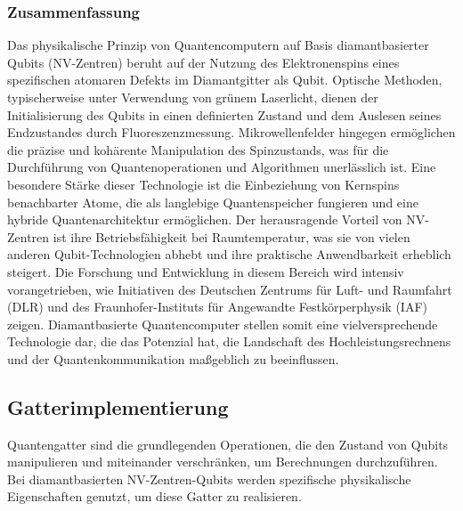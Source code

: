 \subsubsection{Zusammenfassung}
Das physikalische Prinzip von Quantencomputern auf Basis diamantbasierter Qubits (NV-Zentren) beruht auf der Nutzung des Elektronenspins eines spezifischen atomaren Defekts im Diamantgitter als Qubit. Optische Methoden, typischerweise unter Verwendung von grünem Laserlicht, dienen der Initialisierung des Qubits in einen definierten Zustand und dem Auslesen seines Endzustandes durch Fluoreszenzmessung. Mikrowellenfelder hingegen ermöglichen die präzise und kohärente Manipulation des Spinzustands, was für die Durchführung von Quantenoperationen und Algorithmen unerlässlich ist. Eine besondere Stärke dieser Technologie ist die Einbeziehung von Kernspins benachbarter Atome, die als langlebige Quantenspeicher fungieren und eine hybride Quantenarchitektur ermöglichen.
Der herausragende Vorteil von NV-Zentren ist ihre Betriebsfähigkeit bei Raumtemperatur, was sie von vielen anderen Qubit-Technologien abhebt und ihre praktische Anwendbarkeit erheblich steigert.  Die Forschung und Entwicklung in diesem Bereich wird intensiv vorangetrieben, wie Initiativen des Deutschen Zentrums für Luft- und Raumfahrt (DLR) und des Fraunhofer-Instituts für Angewandte Festkörperphysik (IAF) zeigen. Diamantbasierte Quantencomputer stellen somit eine vielversprechende Technologie dar, die das Potenzial hat, die Landschaft des Hochleistungsrechnens und der Quantenkommunikation maßgeblich zu beeinflussen.


\subsection{Gatterimplementierung}
Quantengatter sind die grundlegenden Operationen, die den Zustand von Qubits manipulieren und miteinander verschränken, um Berechnungen durchzuführen. Bei diamantbasierten NV-Zentren-Qubits werden spezifische physikalische Eigenschaften genutzt, um diese Gatter zu realisieren.
